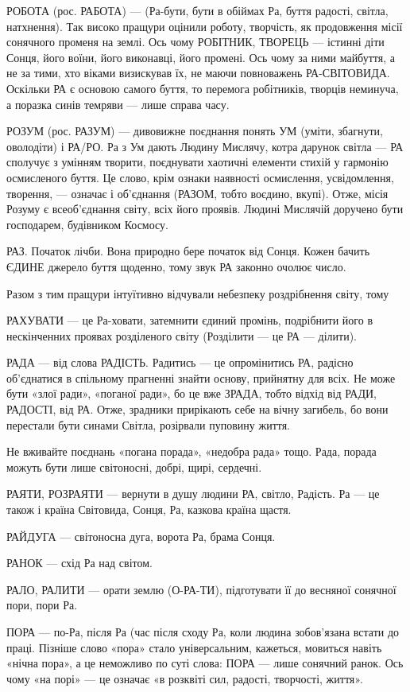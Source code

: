 РОБОТА (рос. РАБОТА) — (Ра-бути, бути в обіймах Ра, буття радості, світла,
натхнення). Так високо пращури оцінили роботу, творчість, як продовження місії
сонячного променя на землі. Ось чому РОБІТНИК, ТВОРЕЦЬ — істинні діти Сонця,
його воїни, його виконавці, його промені. Ось чому за ними майбуття, а не за
тими, хто віками визискував їх, не маючи повноважень РА-СВІТОВИДА. Оскільки РА
є основою самого буття, то перемога робітників, творців неминуча, а поразка
синів темряви — лише справа часу.

РОЗУМ (рос. РАЗУМ) — дивовижне поєднання понять УМ (уміти, збагнути, оволодіти)
і РА/РО. Ра з Ум дають Людину Мислячу, котра дарунок світла — РА сполучує з
умінням творити, поєднувати хаотичні елементи стихій у гармонію осмисленого
буття. Це слово, крім ознаки наявності осмислення, усвідомлення, творення, —
означає і об’єднання (РАЗОМ, тобто воєдино, вкупі). Отже, місія Розуму є
всеоб’єднання світу, всіх його проявів. Людині Мислячій доручено бути
господарем, будівником Космосу.

РАЗ. Початок лічби. Вона природно бере початок від Сонця. Кожен бачить ЄДИНЕ
джерело буття щоденно, тому звук РА законно очолює число.

Разом з тим пращури інтуїтивно відчували небезпеку роздрібнення світу, тому

РАХУВАТИ — це Ра-ховати, затемнити єдиний промінь, подрібнити його в
нескінченних проявах розділеного світу (Розділити — це РА — ділити).

РАДА — від слова РАДІСТЬ. Радитись — це опромінитись РА, радісно об’єднатися в
спільному прагненні знайти основу, прийнятну для всіх. Не може бути «злої
ради», «поганої ради», бо це вже ЗРАДА, тобто відхід від РАДИ, РАДОСТІ, від РА.
Отже, зрадники прирікають себе на вічну загибель, бо вони перестали бути синами
Світла, розірвали пуповину життя.

Не вживайте поєднань «погана порада», «недобра рада» тощо. Рада, порада можуть
бути лише світоносні, добрі, щирі, сердечні.

РАЯТИ, РОЗРАЯТИ — вернути в душу людини РА, світло, Радість. Ра — це також і
країна Світовида, Сонця, Ра, казкова країна щастя.

РАЙДУГА — світоносна дуга, ворота Ра, брама Сонця.

РАНОК — схід Ра над світом.

РАЛО, РАЛИТИ — орати землю (О-РА-ТИ), підготувати її до весняної сонячної пори,
пори Ра.

ПОРА — по-Ра, після Ра (час після сходу Ра, коли людина зобов’язана встати до
праці. Пізніше слово «пора» стало універсальним, кажеться, мовиться навіть
«нічна пора», а це неможливо по суті слова: ПОРА — лише сонячний ранок. Ось
чому «на порі» — це означає «в розквіті сил, радості, творчості, життя».

